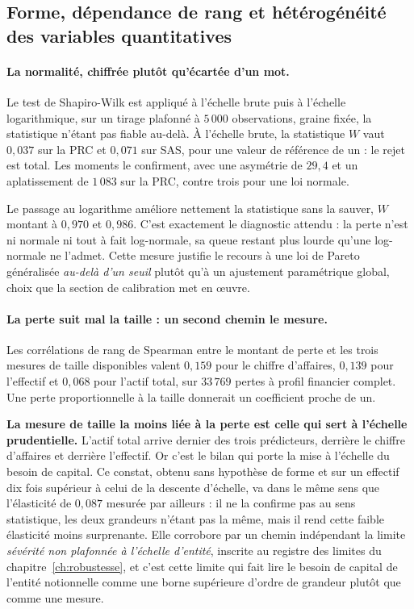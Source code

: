 \subsection{Forme, dépendance de rang et hétérogénéité des variables quantitatives}
\label{subsec:tests-quantitatifs}

\paragraph{La normalité, chiffrée plutôt qu'écartée d'un mot.} Le test de Shapiro-Wilk est
appliqué à l'échelle brute puis à l'échelle logarithmique, sur un tirage plafonné à $5\,000$
observations, graine fixée, la statistique n'étant pas fiable au-delà. À l'échelle brute, la
statistique $W$ vaut $0{,}037$ sur la PRC et $0{,}071$ sur SAS, pour une valeur de référence de
un : le rejet est total. Les moments le confirment, avec une asymétrie de $29{,}4$ et un
aplatissement de $1\,083$ sur la PRC, contre trois pour une loi normale.

Le passage au logarithme améliore nettement la statistique sans la sauver, $W$ montant à
$0{,}970$ et $0{,}986$. C'est exactement le diagnostic attendu : la perte n'est ni normale ni
tout à fait log-normale, sa queue restant plus lourde qu'une log-normale ne l'admet. Cette
mesure justifie le recours à une loi de Pareto généralisée \emph{au-delà d'un seuil} plutôt
qu'à un ajustement paramétrique global, choix que la section de calibration met en \oe uvre.

\paragraph{La perte suit mal la taille : un second chemin le mesure.} Les
corrélations de rang de Spearman entre le montant de perte et les trois mesures de taille
disponibles valent $0{,}159$ pour le chiffre d'affaires, $0{,}139$ pour l'effectif et $0{,}068$
pour l'actif total, sur $33\,769$ pertes à profil financier complet. Une perte proportionnelle à
la taille donnerait un coefficient proche de un.

\begin{attention}
\textbf{La mesure de taille la moins liée à la perte est celle qui sert à l'échelle
prudentielle.} L'actif total arrive dernier des trois prédicteurs, derrière le chiffre d'affaires
et derrière l'effectif. Or c'est le bilan qui porte la mise à l'échelle du besoin de capital. Ce
constat, obtenu sans hypothèse de forme et sur un effectif dix fois supérieur à celui de la
descente d'échelle, va dans le même sens que l'élasticité de $0{,}087$ mesurée par ailleurs : il
ne la confirme pas au sens statistique, les deux grandeurs n'étant pas la même, mais il rend
cette faible élasticité moins surprenante. Elle corrobore par un chemin indépendant la limite
\emph{sévérité non plafonnée à l'échelle d'entité}, inscrite au registre des limites du
chapitre~\ref{ch:robustesse}, et c'est cette limite qui fait lire le besoin de capital de
l'entité notionnelle comme une borne supérieure d'ordre de grandeur plutôt que comme une mesure.
\end{attention}

